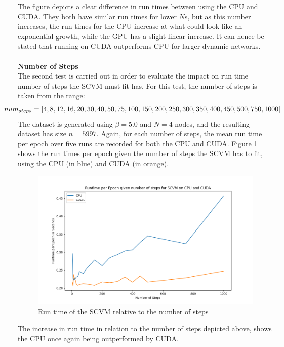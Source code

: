 \noindent
The figure depicts a clear difference in run times between using the CPU and CUDA.
They both have similar run times for lower $N$s, but as this number increases, the run times for the CPU increase at what could look like an exponential growth, while the GPU has a slight linear increase.
It can hence be stated that running on CUDA outperforms CPU for larger dynamic networks.
\\\\
\textbf{Number of Steps}
\\
The second test is carried out in order to evaluate the impact on run time number of steps the SCVM must fit has.
For this test, the number of steps is taken from the range:
\begin{equation*}
    \hspace*{-0.8cm} num_{steps} = [4,8,12,16,20,30,40,50,75,100,150,200,250,300,350,400,450,500,750,1000]\hspace*{-0.5cm}
\end{equation*}
The dataset is generated using $\beta = 5.0$ and $N = 4$ nodes, and the resulting dataset has size $n = 5997$.
Again, for each number of steps, the mean run time per epoch over five runs are recorded for both the CPU and CUDA.
Figure \ref{fig:NumStepsRuntimes} shows the run times per epoch given the number of steps the SCVM has to fit, using the CPU (in blue) and CUDA (in orange).
\begin{figure}[H]
    \centering
    \includegraphics[width=\textwidth]{0_images/steps_runtime2.png}
    \caption{Run time of the SCVM relative to the number of steps}
    \label{fig:NumStepsRuntimes}
\end{figure}
\noindent
The increase in run time in relation to the number of steps depicted above, shows the CPU once again being outperformed by CUDA.
